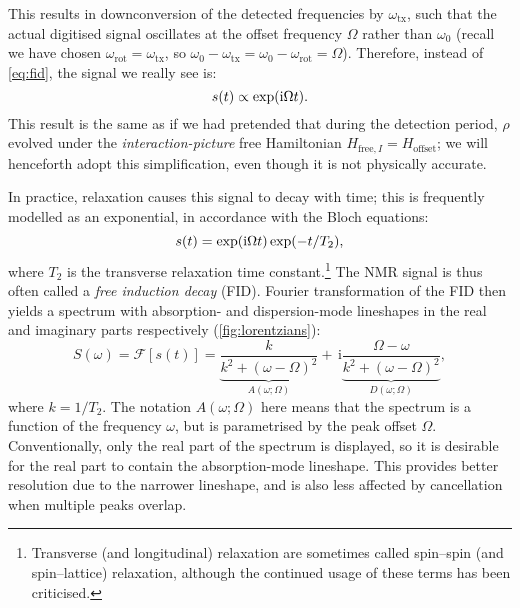 This results in downconversion of the detected frequencies by $\omega_\text{tx}$, such that the actual digitised signal oscillates at the offset frequency $\Omega$ rather than $\omega_0$ (recall we have chosen $\omega_\text{rot} = \omega_\text{tx}$, so $\omega_0 - \omega_\text{tx} = \omega_0 - \omega_\text{rot} = \Omega$).
Therefore, instead of \cref{eq:fid}, the signal we really see is:
\begin{equation}
    \label{eq:fid_reduced}
    s(t) \propto \exp(\mathrm{i} \Omega t).
\end{equation}
This result is the same as if we had pretended that during the detection period, $\rho$ evolved under the \textit{interaction-picture} free Hamiltonian $H_{\text{free},I} = H_\text{offset}$; we will henceforth adopt this simplification, even though it is not physically accurate.

In practice, relaxation causes this signal to decay with time; this is frequently modelled as an exponential, in accordance with the Bloch equations\autocite{Bloch1946PR}:
\begin{equation}
    \label{eq:fid_with_relaxation}
    s(t) = \exp(\mathrm{i}\Omega t)\exp(-t/T_2),
\end{equation}
where $T_2$ is the transverse relaxation time constant.\footnote{Transverse (and longitudinal) relaxation are sometimes called spin--spin (and spin--lattice) relaxation, although the continued usage of these terms has been criticised\autocite{Levitt2008,Keeler2010,Gupta2021JPCL}.}
The NMR signal is thus often called a \textit{free induction decay} (FID).
Fourier transformation of the FID then yields a spectrum with absorption- and dispersion-mode lineshapes in the real and imaginary parts respectively (\cref{fig:lorentzians}):
\begin{equation}
    \label{eq:lorentzian}
    S(\omega) = \mathcal{F}[s(t)] =
    \underbrace{\frac{k}{k^2 + (\omega - \Omega)^2}}_{A(\omega; \Omega)}
    +\, \mathrm{i}\underbrace{\frac{\Omega - \omega}{k^2 + (\omega - \Omega)^2}}_{D(\omega; \Omega)},
\end{equation}
where $k = 1/T_2$.
The notation $A(\omega; \Omega)$ here means that the spectrum is a function of the frequency $\omega$, but is parametrised by the peak offset $\Omega$.
Conventionally, only the real part of the spectrum is displayed, so it is desirable for the real part to contain the absorption-mode lineshape.
This provides better resolution due to the narrower lineshape, and is also less affected by cancellation when multiple peaks overlap.

